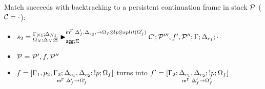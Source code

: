 \item Match succeeds with backtracking to a persistent continuation frame
in stack $\lstack{P}$ ($\lstack{C} = \cdot$):
\begin{itemize}[leftmargin=\secondm]
   \item $s_2 = \matstatea{\Delta_N}{\lstack{C'}; \lstack{P'''}, f', \lstack{P''}}
         {\Gamma}{\Delta_{c_1}}{\cdot}{\Delta'_f, \Delta_{c_2}, 
         \rightarrow \Omega_f \otimes \bang p \otimes split(\Omega'_f)}{\Sigma}$

   \item $\lstack{P} = \lstack{P'}, f, \lstack{P''}$

   \item $f = \pframe{\Gamma_1, p_2,
      \Gamma_2}{\Delta_{c_1}, \Delta_{c_2}}{\bang p}{\Omega_f}{\Delta'_f}{\Omega'_f}$
   turns into $f' = \pframe{\Gamma_2}{\Delta_{c_1},
      \Delta_{c_2}}{\bang p}{\Omega_f}{\Delta'_f}{\Omega'_f}$

\end{itemize}
